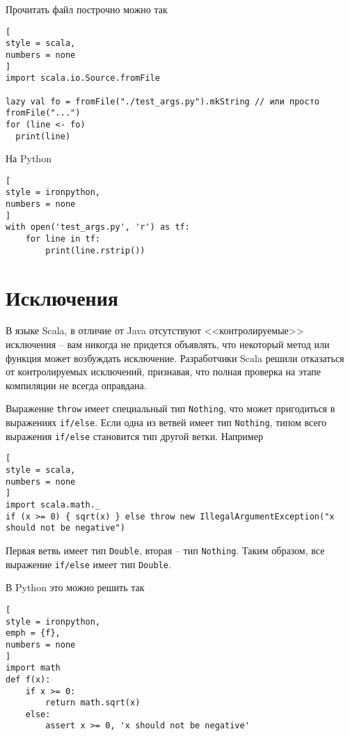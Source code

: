 \documentclass[%
	11pt,
	a4paper,
	utf8,
		]{article}
\begin{document}
Прочитать файл построчно можно так
\begin{lstlisting}[
style = scala,
numbers = none
]
import scala.io.Source.fromFile

lazy val fo = fromFile("./test_args.py").mkString // или просто fromFile("...")
for (line <- fo)
  print(line)
\end{lstlisting}

На Python
\begin{lstlisting}[
style = ironpython,
numbers = none
]
with open('test_args.py', 'r') as tf:
    for line in tf:
        print(line.rstrip())
\end{lstlisting}


\section{Исключения}

В языке Scala, в отличие от Java отсутствуют <<контролируемые>> исключения -- вам никогда не придется объявлять, что некоторый метод или функция может возбуждать исключение. Разработчики Scala решили отказаться от контролируемых исключений, признавая, что полная проверка на этапе компиляции не всегда оправдана.

Выражение \texttt{throw} имеет специальный тип \texttt{Nothing}, что может пригодиться в выражениях \texttt{if/else}. Если одна из ветвей имеет тип \texttt{Nothing}, типом всего выражения \texttt{if/else} становится тип другой ветки. Например
\begin{lstlisting}[
style = scala,
numbers = none
]
import scala.math._
if (x >= 0) { sqrt(x) } else throw new IllegalArgumentException("x should not be negative")
\end{lstlisting}

Первая ветвь имеет тип \texttt{Double}, вторая -- тип \texttt{Nothing}. Таким образом, все выражение \texttt{if/else} имеет тип \texttt{Double}.

В Python это можно решить так
\begin{lstlisting}[
style = ironpython,
emph = {f},
numbers = none	
]
import math
def f(x):
    if x >= 0:
        return math.sqrt(x)
    else:
        assert x >= 0, 'x should not be negative'
\end{lstlisting}
\end{document}
